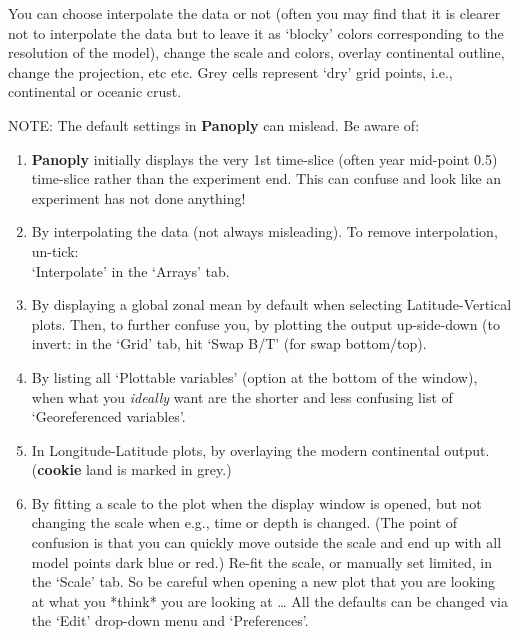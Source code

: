 You can choose interpolate the data or not (often you may find that it is clearer not to interpolate the data but to leave it as ‘blocky’ colors corresponding to the resolution of the model), change the scale and colors, overlay continental outline, change the projection, etc etc. Grey cells represent ‘dry’ grid points, i.e., continental or oceanic crust.

\vspace{1mm}
NOTE: The default settings in \textbf{Panoply} can mislead. Be aware of:
\vspace{1mm}
\begin{enumerate}
\item \textbf{Panoply} initially displays the very 1st time-slice (often year mid-point 0.5) time-slice rather than the experiment end. This can confuse and look like an experiment has not done anything!
\item By interpolating the data (not always misleading). To remove interpolation, un-tick:
\\‘\textsf{\footnotesize Interpolate}’ in the ‘\textsf{\footnotesize Arrays}’ tab.
\item By displaying a global zonal mean by default when selecting \textsf{\footnotesize Latitude-Vertical} plots. Then, to further confuse you, by plotting the output up-side-down (to invert: in the ‘\textsf{\footnotesize Grid}’ tab, hit ‘\textsf{\footnotesize Swap B/T}’ (for swap bottom/top).
\item By listing all ‘\textsf{\footnotesize Plottable variables}’ (option at the bottom of the window), when what you \textit{ideally} want are  the shorter and less confusing list of ‘\textsf{\footnotesize Georeferenced variables}’.
\item In \textsf{\footnotesize Longitude-Latitude} plots, by overlaying the modern continental output. (\textbf{cookie} land is marked in grey.)
\item By fitting a scale to the plot when the display window is opened, but not changing the scale when e.g., time or depth is changed. (The point of confusion is that you can quickly move outside the scale and end up with all model points dark blue or red.) Re-fit the scale, or manually set limited, in the ‘\textsf{\footnotesize Scale}’ tab.
So be careful when opening a new plot that you are looking at what you *think* you are looking at …
All the defaults can be changed via the ‘\textsf{\footnotesize Edit}’ drop-down menu and ‘\textsf{\footnotesize Preferences}’.
\end{enumerate}

